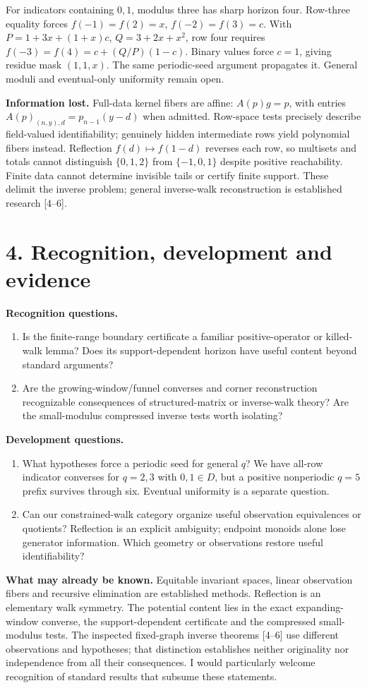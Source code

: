 \documentclass[10pt]{article}
\begin{document}
For indicators containing $0,1$, modulus three has sharp horizon four. Row-three equality forces $f(-1)=f(2)=x$, $f(-2)=f(3)=c$. With $P=1+3x+(1+x)c$, $Q=3+2x+x^2$, row four requires $f(-3)=f(4)=c+(Q/P)(1-c)$. Binary values force $c=1$, giving residue mask $(1,1,x)$. The same periodic-seed argument propagates it. General moduli and eventual-only uniformity remain open.

\textbf{Information lost.} Full-data kernel fibers are affine: $A(p)g=p$, with entries $A(p)_{(n,y),d}=p_{n-1}(y-d)$ when admitted. Row-space tests precisely describe field-valued identifiability; genuinely hidden intermediate rows yield polynomial fibers instead. Reflection $f(d)\mapsto f(1-d)$ reverses each row, so multisets and totals cannot distinguish $\{0,1,2\}$ from $\{-1,0,1\}$ despite positive reachability. Finite data cannot determine invisible tails or certify finite support. These delimit the inverse problem; general inverse-walk reconstruction is established research [4--6].
\newpage
\section*{4. Recognition, development and evidence}
\textbf{Recognition questions.}
\begin{enumerate}
\item Is the finite-range boundary certificate a familiar positive-operator or killed-walk lemma? Does its support-dependent horizon have useful content beyond standard arguments?
\item Are the growing-window/funnel converses and corner reconstruction recognizable consequences of structured-matrix or inverse-walk theory? Are the small-modulus compressed inverse tests worth isolating?
\end{enumerate}
\textbf{Development questions.}
\begin{enumerate}
\item What hypotheses force a periodic seed for general $q$? We have all-row indicator converses for $q=2,3$ with $0,1\in D$, but a positive nonperiodic $q=5$ prefix survives through six. Eventual uniformity is a separate question.
\item Can our constrained-walk category organize useful observation equivalences or quotients? Reflection is an explicit ambiguity; endpoint monoids alone lose generator information. Which geometry or observations restore useful identifiability?
\end{enumerate}

\textbf{What may already be known.} Equitable invariant spaces, linear observation fibers and recursive elimination are established methods. Reflection is an elementary walk symmetry. The potential content lies in the exact expanding-window converse, the support-dependent certificate and the compressed small-modulus tests. The inspected fixed-graph inverse theorems [4--6] use different observations and hypotheses; that distinction establishes neither originality nor independence from all their consequences. I would particularly welcome recognition of standard results that subsume these statements.
\end{document}
